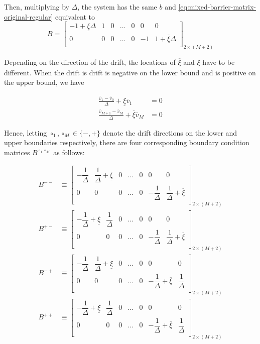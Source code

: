 \documentclass[11pt]{article}
\theoremstyle{definition}
\begin{document}
Then, multiplying by $\Delta$, the system has the same $b$ and \cref{eq:mixed-barrier-matrix-original-regular}  equivalent to
\begin{equation}
B = \begin{bmatrix}
-1 +  \underline{\xi} \Delta & 1 & 0 & \dots & 0 & 0 & 0 \\
0 & 0 & 0 & \dots & 0 & -1 & 1 + \overline{\xi} \Delta\\
\end{bmatrix}_{2 \times (M+2)}\label{eq:B-mixed}
\end{equation}

Depending on the direction of the drift, the locations of $\overline{\xi}$ and $\underline{\xi}$ have to be different. When the drift is drift is negative on the lower bound and is positive on the upper bound, we have

\begin{align}
\frac{\overline{v}_1 - \overline{v}_0}{\Delta} + \underline{\xi} \overline{v}_1 &= 0 \label{eq:mixed-BC1-negative}  \\
\frac{\overline{v}_{M+1} - \overline{v}_M}{\Delta} + \overline{\xi} \overline{v}_{M} &= 0 \label{eq:mixed-BC2-positive}
\end{align}

Hence, letting $\circ_1, \circ_M \in \{-, +\}$ denote the drift directions on the lower and upper boundaries respectively, there are four corresponding boundary condition matrices $B^{\circ_1 \circ_M}$ as follows:
 
\begin{align}
B^{--} &\equiv 
\begin{bmatrix}
-\dfrac{1}{\Delta} & \dfrac{1}{\Delta}  + \underline{\xi} & 0 & \dots & 0 & 0 & 0 \\
0 & 0 & 0 & \dots & 0 & -\dfrac{1}{\Delta} & \dfrac{1}{\Delta} + \overline{\xi}\\
\end{bmatrix}_{2 \times (M+2)} \\
B^{+-} &\equiv 
\begin{bmatrix}
-\dfrac{1}{\Delta} + \underline{\xi} & \dfrac{1}{\Delta} & 0 & \dots & 0 & 0 & 0 \\
0 & 0 & 0 & \dots & 0 & -\dfrac{1}{\Delta} & \dfrac{1}{\Delta} + \overline{\xi}\\
\end{bmatrix}_{2 \times (M+2)} \\
B^{-+} &\equiv 
\begin{bmatrix}
-\dfrac{1}{\Delta}  & \dfrac{1}{\Delta} + \underline{\xi} & 0 & \dots & 0 & 0 & 0 \\
0 & 0 & 0 & \dots & 0 & -\dfrac{1}{\Delta}+ \overline{\xi} & \dfrac{1}{\Delta}\\
\end{bmatrix}_{2 \times (M+2)} \\
B^{++} &\equiv 
\begin{bmatrix}
-\dfrac{1}{\Delta} + \underline{\xi} & \dfrac{1}{\Delta} & 0 & \dots & 0 & 0 & 0 \\
0 & 0 & 0 & \dots & 0 & -\dfrac{1}{\Delta}+ \overline{\xi} & \dfrac{1}{\Delta} \\
\end{bmatrix}_{2 \times (M+2)}
\end{align}
\end{document}
